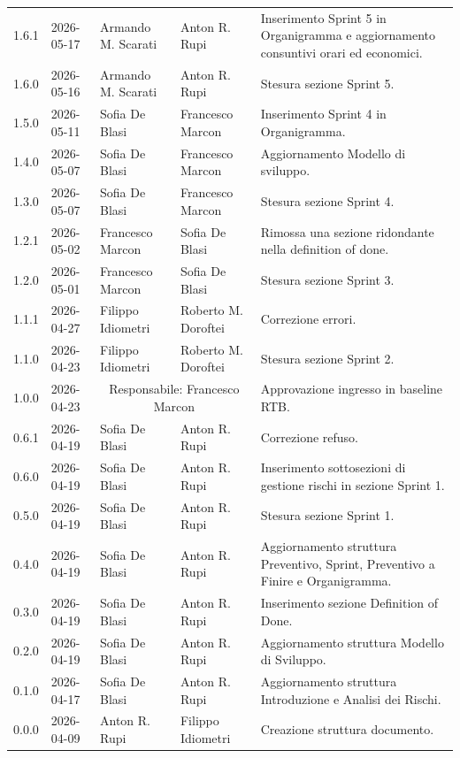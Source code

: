 \begin{longtable}{>{\ttfamily\small}l l l l >{\raggedright\arraybackslash}p{4cm}}
    1.6.1 & 2026-05-17 & Armando M. Scarati & Anton R. Rupi & Inserimento Sprint 5 in Organigramma e aggiornamento consuntivi orari ed economici. \\
    1.6.0 & 2026-05-16 & Armando M. Scarati & Anton R. Rupi & Stesura sezione Sprint 5. \\
    1.5.0 & 2026-05-11 & Sofia De Blasi & Francesco Marcon & Inserimento Sprint 4 in Organigramma. \\
    1.4.0 & 2026-05-07 & Sofia De Blasi & Francesco Marcon & Aggiornamento Modello di sviluppo. \\
    1.3.0 & 2026-05-07 & Sofia De Blasi & Francesco Marcon & Stesura sezione Sprint 4. \\
    1.2.1 & 2026-05-02 & {Francesco Marcon} & {Sofia De Blasi} & Rimossa una sezione ridondante nella definition of done. \\
    1.2.0 & 2026-05-01 & {Francesco Marcon} & {Sofia De Blasi} & Stesura sezione Sprint 3. \\
    1.1.1 & 2026-04-27 & {Filippo Idiometri} & {Roberto M. Doroftei} & Correzione errori. \\
    1.1.0 & 2026-04-23 & {Filippo Idiometri} & {Roberto M. Doroftei} & Stesura sezione Sprint 2. \\
    1.0.0 & 2026-04-23 & \multicolumn{2}{c}{Responsabile: Francesco Marcon} & Approvazione ingresso in baseline RTB. \\
    0.6.1 & 2026-04-19 & {Sofia De Blasi} & {Anton R. Rupi} & Correzione refuso. \\
    0.6.0 & 2026-04-19 & {Sofia De Blasi} & {Anton R. Rupi} & Inserimento sottosezioni di gestione rischi in sezione Sprint 1. \\
    0.5.0 & 2026-04-19 & {Sofia De Blasi} & {Anton R. Rupi} & Stesura sezione Sprint 1. \\
    0.4.0 & 2026-04-19 & {Sofia De Blasi} & {Anton R. Rupi} & Aggiornamento struttura Preventivo, Sprint, Preventivo a Finire e Organigramma. \\
    0.3.0 & 2026-04-19 & {Sofia De Blasi} & {Anton R. Rupi} & Inserimento sezione Definition of Done. \\
    0.2.0 & 2026-04-19 & {Sofia De Blasi} & {Anton R. Rupi} & Aggiornamento struttura Modello di Sviluppo. \\
    0.1.0 & 2026-04-17 & {Sofia De Blasi} & {Anton R. Rupi} & Aggiornamento struttura Introduzione e Analisi dei Rischi. \\
    0.0.0 & 2026-04-09 & {Anton R. Rupi} & {Filippo Idiometri} & Creazione struttura documento. \\
\end{longtable}